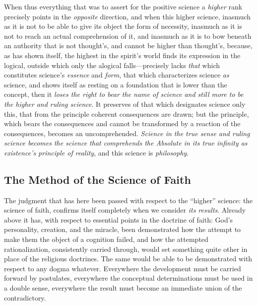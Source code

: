 \documentclass[12pt,a4paper]{book}
\begin{document}
When thus everything that was to assert for the positive science a \emph{higher} rank precisely points in
the \emph{opposite} direction, and when this higher science, inasmuch as it is not to be able to give its
object the form of necessity, inasmuch as it is not to reach an actual comprehension of it, and
inasmuch as it is to bow beneath an authority that is not thought's, and cannot be higher than
thought's, because, as has shown itself, the highest in the spirit's world finds its expression in
the logical, outside which only the alogical falls---precisely lacks \emph{that} which constitutes
science's \emph{essence} and \emph{form}, that which characterizes science \emph{as} science, and shows itself as
resting on a foundation that is lower than the concept, then it \emph{loses the right to bear the
name of science and still more to be the higher and ruling science}. It preserves of that which
designates science only this, that from the principle coherent consequences are drawn; but the
principle, which bears the consequences and cannot be transformed by a reaction of the consequences,
becomes an uncomprehended. \emph{Science in the true sense and ruling science becomes the science
that comprehends the Absolute in its true infinity as existence's principle of reality}, and this
science is \emph{philosophy}.

\subsection{The Method of the Science of Faith}
\label{ssec:method}

The judgment that has here been passed with respect to the ``higher'' science: the
science of faith, confirms itself completely when we consider \emph{its results}. Already above
it has, with respect to essential points in the doctrine of faith: God's personality,
creation, and the miracle, been demonstrated how the attempt to make them the object of a
cognition failed, and how the attempted rationalization, consistently carried through,
would set something quite other in place of the religious doctrines. The same would be
able to be demonstrated with respect to any dogma whatever. Everywhere the development
must be carried forward by postulates, everywhere the conceptual determinations must be
used in a double sense, everywhere the result must become an immediate union of the
contradictory.
\end{document}
